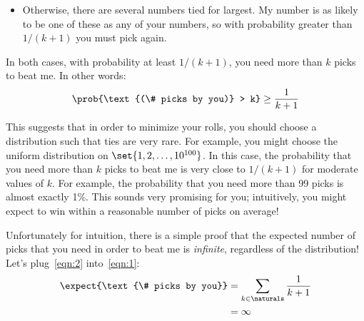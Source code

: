 \begin{editingnotes}
\begin{itemize}
\item Otherwise, there are several numbers tied for largest.  My
number is as likely to be one of these as any of your numbers, so with
probability greater than $1/(k+1)$ you must pick again.

\end{itemize}
%
In both cases, with probability at least $1/(k+1)$, you need more than
$k$ picks to beat me.  In other words:
%
\begin{align}
\prob{\text{(\# picks by you)} > k} \geq \frac{1}{k+1} \label{eqn:2}
\end{align}

This suggests that in order to minimize your rolls, you should choose a
distribution such that ties are very rare.  For example, you might
choose the uniform distribution on $\set{1, 2, \dots, 10^{100}}$.  In
this case, the probability that you need more than $k$ picks to beat
me is very close to $1/(k+1)$ for moderate values of $k$.  For
example, the probability that you need more than 99 picks is almost
exactly 1\%.  This sounds very promising for you; intuitively, you
might expect to win within a reasonable number of picks on average!

Unfortunately for intuition, there is a simple proof that the expected
number of picks that you need in order to beat me is
\emph{infinite}, regardless of the distribution!  Let's
plug~\eqref{eqn:2} into~\eqref{eqn:1}:
%
\begin{align*}
\expect{\text{\# picks by you}}
    & = \sum_{k \in \naturals} \frac{1}{k+1} \\
    & = \infty
\end{align*}

\end{editingnotes}


